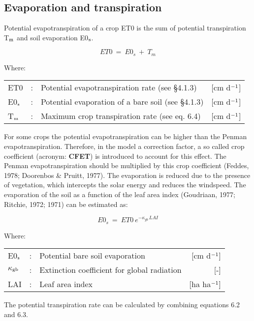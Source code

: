 \subsection{Evaporation and transpiration}
Potential evapotranspiration of a crop ET0 is the sum of potential transpiration T$_{{\rm m}}$ and
soil evaporation E0$_{{\rm s}}$.

\begin{equation}
ET0 ~=~ E0_{s} ~+~ T_{m} 
\end{equation}
 
Where:\\
\begin{tabularx}{\textwidth}{llXr}
ET0 &:& Potential evapotranspiration rate (see \S 4.1.3) & [cm d$^{{\rm -1}}$]\\
E0$_{{\rm s}}$ &:& Potential evaporation of a bare soil (see \S 4.1.3)  & [cm d$^{{\rm -1}}$]\\
T$_{{\rm m}}$ &:& Maximum crop transpiration rate (see eq. 6.4)  & [cm d$^{{\rm -1}}$]\\
\end{tabularx}

For some crops the potential evapotranspiration can be higher than the Penman evapotran\-spiration. 
Therefore, in the model a correction factor, a so called  crop coefficient
(acronym: {\bf CFET}) is introduced to account for this effect. The Penman evapotranspiration
should be multiplied by this crop coefficient (Feddes, 1978; Doorenbos \& Pruitt, 1977).
The evaporation is reduced due to the presence of vegetation, which intercepts the solar
energy and reduces the windspeed. The evaporation of the soil as a function of the leaf
area index (Goudriaan, 1977; Ritchie, 1972; 1971) can be estimated as:

\begin{equation}
E0 _{s} ~=~ ET0 ~e ^{-\kappa_{gb} \, LAI}
\end{equation}

Where:\\
\begin{tabularx}{\textwidth}{llXr}
E0$_{{\rm s}}$ &:& Potential bare soil evaporation  & [cm d$^{{\rm -1}}$]\\
 $\kappa$$_{{\rm gb}}$ &:& Extinction coefficient for global radiation  & [-]\\
 LAI &:& Leaf area index  & [ha ha$^{{\rm -1}}$]\\
\end{tabularx}
 
The potential transpiration rate can be calculated by combining equations 6.2 and 6.3.


